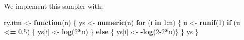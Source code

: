 \documentclass[
  11pt,
]{article}
\newenvironment{Shaded}{\begin{snugshade}}{\end{snugshade}}
\newcommand{\ControlFlowTok}[1]{\textcolor[rgb]{0.13,0.29,0.53}{\textbf{#1}}}
\newcommand{\DecValTok}[1]{\textcolor[rgb]{0.00,0.00,0.81}{#1}}
\newcommand{\FloatTok}[1]{\textcolor[rgb]{0.00,0.00,0.81}{#1}}
\newcommand{\FunctionTok}[1]{\textcolor[rgb]{0.13,0.29,0.53}{\textbf{#1}}}
\newcommand{\NormalTok}[1]{#1}
\newcommand{\OtherTok}[1]{\textcolor[rgb]{0.56,0.35,0.01}{#1}}
\newcommand{\SpecialCharTok}[1]{\textcolor[rgb]{0.81,0.36,0.00}{\textbf{#1}}}
\begin{document}
We implement this sampler with:

\begin{Shaded}
\begin{Highlighting}[]
\NormalTok{ry.itm }\OtherTok{\textless{}{-}} \ControlFlowTok{function}\NormalTok{(n)}
\NormalTok{\{}
\NormalTok{  ys }\OtherTok{\textless{}{-}} \FunctionTok{numeric}\NormalTok{(n)}
  \ControlFlowTok{for}\NormalTok{ (i }\ControlFlowTok{in} \DecValTok{1}\SpecialCharTok{:}\NormalTok{n)}
\NormalTok{  \{}
\NormalTok{    u }\OtherTok{\textless{}{-}} \FunctionTok{runif}\NormalTok{(}\DecValTok{1}\NormalTok{)}
    \ControlFlowTok{if}\NormalTok{ (u }\SpecialCharTok{\textless{}=} \FloatTok{0.5}\NormalTok{) \{ ys[i] }\OtherTok{\textless{}{-}} \FunctionTok{log}\NormalTok{(}\DecValTok{2}\SpecialCharTok{*}\NormalTok{u) \}}
    \ControlFlowTok{else}\NormalTok{ \{ ys[i] }\OtherTok{\textless{}{-}} \SpecialCharTok{{-}}\FunctionTok{log}\NormalTok{(}\DecValTok{2{-}2}\SpecialCharTok{*}\NormalTok{u)\}}
\NormalTok{  \}}
\NormalTok{  ys}
\NormalTok{\}}
\end{Highlighting}
\end{Shaded}
\end{document}
